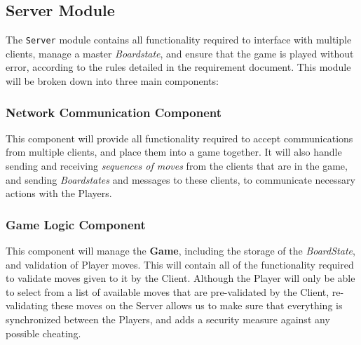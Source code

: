 \documentclass[letterpaper]{article}
\begin{document}
\subsection{Server Module}
\label{sec:architecture_system3}

The \texttt{Server} module contains all functionality required
to interface with multiple clients, manage a master
\emph{Boardstate}, and ensure that the game is played without
error, according to the rules detailed in the requirement
document. This module will be broken down into three main
components:

\subsubsection{Network Communication Component}
\label{sec:architecture_system3_Comm}

This component will provide all functionality required to accept
communications from multiple clients, and place them into a game
together. It will also handle sending and receiving
\emph{sequences of moves} from the clients that are in the game,
and sending \emph{Boardstates} and messages to these clients, to
communicate necessary actions with the Players.

\subsubsection{Game Logic Component}
\label{sec:architecture_system3_logic}

This component will manage the \textbf{Game}, including the
storage of the \emph{BoardState}, and validation of Player
moves. This will contain all of the functionality required to
validate moves given to it by the Client. Although the Player
will only be able to select from a list of available moves that
are pre-validated by the Client, re-validating these moves on
the Server allows us to make sure that everything is
synchronized between the Players, and adds a security measure
against any possible cheating.
\end{document}
